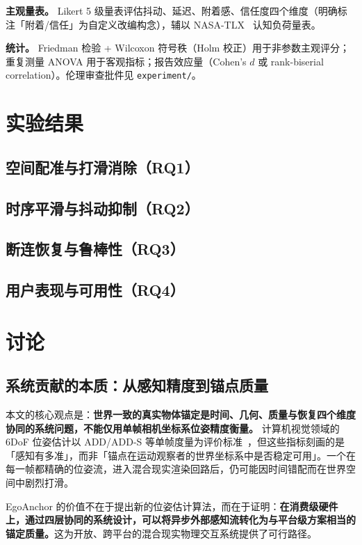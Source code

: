 \documentclass[review]{vgtc}
\begin{document}
\noindent\textbf{主观量表。} Likert 5 级量表评估抖动、延迟、附着感、信任度四个维度（明确标注「附着/信任」为自定义改编构念），辅以 NASA-TLX~\cite{hart1988nasatlx} 认知负荷量表。

\noindent\textbf{统计。} Friedman 检验 + Wilcoxon 符号秩（Holm 校正）用于非参数主观评分；重复测量 ANOVA 用于客观指标；报告效应量（Cohen's $d$ 或 rank-biserial correlation）。伦理审查批件见 \texttt{experiment/}。

\section{实验结果}
\subsection{空间配准与打滑消除（RQ1）}
\subsection{时序平滑与抖动抑制（RQ2）}
\subsection{断连恢复与鲁棒性（RQ3）}
\subsection{用户表现与可用性（RQ4）}

\section{讨论}

\subsection{系统贡献的本质：从感知精度到锚点质量}

本文的核心观点是：\textbf{世界一致的真实物体锚定是时间、几何、质量与恢复四个维度协同的系统问题，不能仅用单帧相机坐标系位姿精度衡量。} 计算机视觉领域的 6DoF 位姿估计以 ADD/ADD-S 等单帧度量为评价标准~\cite{hinterstoisser2012add,posecnn2017}，但这些指标刻画的是「感知有多准」，而非「锚点在运动观察者的世界坐标系中是否稳定可用」。一个在每一帧都精确的位姿流，进入混合现实渲染回路后，仍可能因时间错配而在世界空间中剧烈打滑。

EgoAnchor 的价值不在于提出新的位姿估计算法，而在于证明：\textbf{在消费级硬件上，通过四层协同的系统设计，可以将异步外部感知流转化为与平台级方案相当的锚定质量。}这为开放、跨平台的混合现实物理交互系统提供了可行路径。
\end{document}
